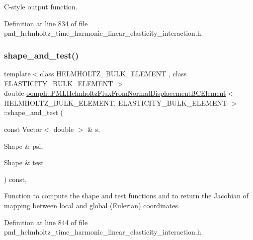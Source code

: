 C-\/style output function. 



Definition at line 834 of file pml\+\_\+helmholtz\+\_\+time\+\_\+harmonic\+\_\+linear\+\_\+elasticity\+\_\+interaction.\+h.

\mbox{\label{classoomph_1_1PMLHelmholtzFluxFromNormalDisplacementBCElement_a4e6b686d2905fc642cb735d611830be4}} 
\subsubsection{\texorpdfstring{shape\+\_\+and\+\_\+test()}{shape\_and\_test()}}
{\footnotesize\ttfamily template$<$class H\+E\+L\+M\+H\+O\+L\+T\+Z\+\_\+\+B\+U\+L\+K\+\_\+\+E\+L\+E\+M\+E\+NT , class E\+L\+A\+S\+T\+I\+C\+I\+T\+Y\+\_\+\+B\+U\+L\+K\+\_\+\+E\+L\+E\+M\+E\+NT $>$ \\
double \hyperlink{classoomph_1_1PMLHelmholtzFluxFromNormalDisplacementBCElement}{oomph\+::\+P\+M\+L\+Helmholtz\+Flux\+From\+Normal\+Displacement\+B\+C\+Element}$<$ H\+E\+L\+M\+H\+O\+L\+T\+Z\+\_\+\+B\+U\+L\+K\+\_\+\+E\+L\+E\+M\+E\+NT, E\+L\+A\+S\+T\+I\+C\+I\+T\+Y\+\_\+\+B\+U\+L\+K\+\_\+\+E\+L\+E\+M\+E\+NT $>$\+::shape\+\_\+and\+\_\+test (\begin{DoxyParamCaption}\item[{const Vector$<$ double $>$ \&}]{s,  }\item[{Shape \&}]{psi,  }\item[{Shape \&}]{test }\end{DoxyParamCaption}) const\hspace{0.3cm}{\ttfamily [inline]}, {\ttfamily [protected]}}



Function to compute the shape and test functions and to return the Jacobian of mapping between local and global (Eulerian) coordinates. 



Definition at line 844 of file pml\+\_\+helmholtz\+\_\+time\+\_\+harmonic\+\_\+linear\+\_\+elasticity\+\_\+interaction.\+h.



